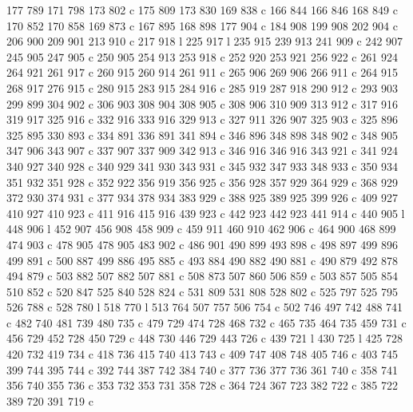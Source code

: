 {{        177 789 171 798 173 802 c
        175 809 173 830 169 838 c
        166 844 166 846 168 849 c
        170 852 170 858 169 873 c
        167 895 168 898 177 904 c
        184 908 199 908 202 904 c
        206 900 209 901 213 910 c
        217 918 l
        225 917 l
        235 915 239 913 241 909 c
        242 907 245 905 247 905 c
        250 905 254 913 253 918 c
        252 920 253 921 256 922 c
        261 924 264 921 261 917 c
        260 915 260 914 261 911 c
        265 906 269 906 266 911 c
        264 915 268 917 276 915 c
        280 915 283 915 284 916 c
        285 919 287 918 290 912 c
        293 903 299 899 304 902 c
        306 903 308 904 308 905 c
        308 906 310 909 313 912 c
        317 916 319 917 325 916 c
        332 916 333 916 329 913 c
        327 911 326 907 325 903 c
        325 896 325 895 330 893 c
        334 891 336 891 341 894 c
        346 896 348 898 348 902 c
        348 905 347 906 343 907 c
        337 907 337 909 342 913 c
        346 916 346 916 343 921 c
        341 924 340 927 340 928 c
        340 929 341 930 343 931 c
        345 932 347 933 348 933 c
        350 934 351 932 351 928 c
        352 922 356 919 356 925 c
        356 928 357 929 364 929 c
        368 929 372 930 374 931 c
        377 934 378 934 383 929 c
        388 925 389 925 399 926 c
        409 927 410 927 410 923 c
        411 916 415 916 439 923 c
        442 923 442 923 441 914 c
        440 905 l
        448 906 l
        452 907 456 908 458 909 c
        459 911 460 910 462 906 c
        464 900 468 899 474 903 c
        478 905 478 905 483 902 c
        486 901 490 899 493 898 c
        498 897 499 896 499 891 c
        500 887 499 886 495 885 c
        493 884 490 882 490 881 c
        490 879 492 878 494 879 c
        503 882 507 882 507 881 c
        508 873 507 860 506 859 c
        503 857 505 854 510 852 c
        520 847 525 840 528 824 c
        531 809 531 808 528 802 c
        525 797 525 795 526 788 c
        528 780 l
        518 770 l
        513 764 507 757 506 754 c
        502 746 497 742 488 741 c
        482 740 481 739 480 735 c
        479 729 474 728 468 732 c
        465 735 464 735 459 731 c
        456 729 452 728 450 729 c
        448 730 446 729 443 726 c
        439 721 l
        430 725 l
        425 728 420 732 419 734 c
        418 736 415 740 413 743 c
        409 747 408 748 405 746 c
        403 745 399 744 395 744 c
        392 744 387 742 384 740 c
        377 736 377 736 361 740 c
        358 741 356 740 355 736 c
        353 732 353 731 358 728 c
        364 724 367 723 382 722 c
        385 722 389 720 391 719 c
}}
